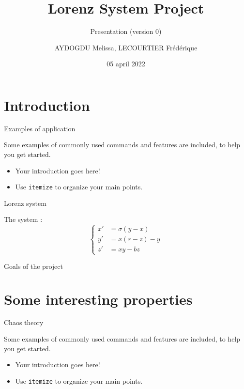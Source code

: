 \documentclass[10pt,xcolor={table,dvipsnames},t]{beamer}
\title[Your Short Title]{Lorenz System Project}
\subtitle{Presentation (version 0)}
\author[name]{AYDOGDU Melissa, LECOURTIER Frédérique}
\institute{\large Strasbourg University}
\date{05 april 2022}
\begin{document}
\begin{frame}
  \titlepage
\end{frame}




\section{Introduction}


\begin{frame}{Examples of application}
    
    Some examples of commonly used commands and features are included, to help you get started.
    \begin{itemize}
      \item Your introduction goes here!
      \item Use \texttt{itemize} to organize your main points.
    \end{itemize}

\end{frame}

\begin{frame}{Lorenz system}
    
    The system :
    $$\left\{\begin{aligned} 
    x'&=\sigma(y-x) \\
    y'&=x(r-z)-y \\
    z'&=xy-bz
    \end{aligned}\right.$$

\end{frame}
\begin{frame}{Goals of the project}
    

\end{frame}


\section{Some interesting properties}

\begin{frame}{Chaos theory}

    Some examples of commonly used commands and features are included, to help you get started.
    \begin{itemize}
      \item Your introduction goes here!
      \item Use \texttt{itemize} to organize your main points.
    \end{itemize}

\end{frame}
\end{document}
